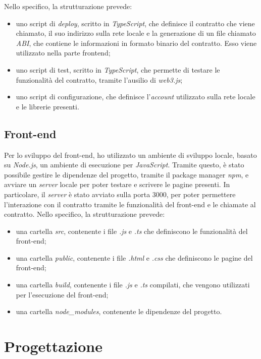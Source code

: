 Nello specifico, la strutturazione prevede:
\begin{itemize}
    \item uno script di \textit{deploy}, scritto in \textit{TypeScript}, che definisce il contratto che viene chiamato, il suo indirizzo sulla rete locale
    e la generazione di un file  chiamato \textit{ABI}, che contiene le informazioni in formato binario del contratto. Esso viene utilizzato nella parte frontend;
    \item uno script di test, scritto in \textit{TypeScript}, che permette di testare le funzionalità del contratto, tramite l'ausilio di \textit{web3.js};
    \item uno script di configurazione, che definisce l'\textit{account} utilizzato sulla rete locale e le librerie presenti.
\end{itemize}

\subsection{Front-end}\label{subsec:frontend}
Per lo sviluppo del front-end, ho utilizzato un ambiente di sviluppo locale, basato su \textit{Node.js}, un ambiente di esecuzione per \textit{JavaScript}.
Tramite questo, è stato possibile gestire le dipendenze del progetto, tramite il package manager \textit{npm}, e avviare un \textit{server} locale per poter testare
e scrivere le pagine presenti. In particolare, il \textit{server} è stato avviato sulla porta 3000, per poter permettere l'interazione con il contratto tramite
le funzionalità del front-end e le chiamate al contratto.
Nello specifico, la strutturazione prevede:
\begin{itemize}
    \item una cartella \textit{src}, contenente i file \textit{.js} e \textit{.ts} che definiscono le funzionalità del front-end;
    \item una cartella \textit{public}, contenente i file \textit{.html} e \textit{.css} che definiscono le pagine del front-end;
    \item una cartella \textit{build}, contenente i file \textit{.js} e \textit{.ts} compilati, che vengono utilizzati per l'esecuzione del front-end;
    \item una cartella \textit{node\_modules}, contenente le dipendenze del progetto.
\end{itemize}

\newpage
\section{Progettazione}\label{sec:progettazione-requisiti}


